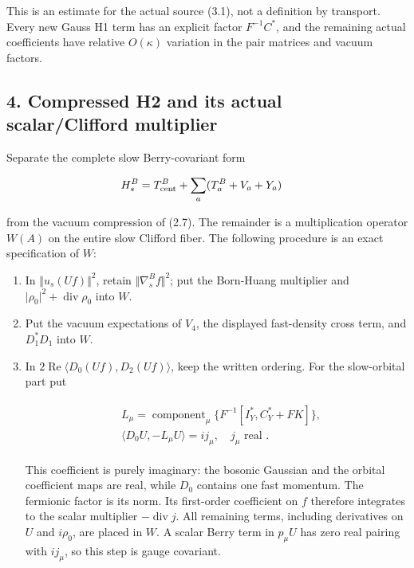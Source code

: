 This is an estimate for the actual source (3.1), not a definition by
transport. Every new Gauss H1 term has an explicit factor
\(F^{-1} C^{*}\), and the remaining actual coefficients have relative
\(O(\kappa )\) variation in the pair matrices and vacuum factors.

\subsection{4. Compressed H2 and its actual scalar/Clifford
multiplier}\label{d-compressed-h2-and-its-actual-scalarclifford-multiplier}

Separate the complete slow Berry-covariant form

\begin{gather*}
\begin{aligned}
& H_{s}^{B}=T_{\mathrm{cent}}^{B}+\sum _{a}(T_{a}^{B}+V_{a}+Y_{a})
\end{aligned}\notag
\end{gather*}

from the vacuum compression of (2.7). The remainder is a multiplication
operator \(W(A)\) on the entire slow Clifford fiber. The following
procedure is an exact specification of \(W\):

\begin{enumerate}
\def\labelenumi{\arabic{enumi}.}
\item
  In \(\Vert u_{s}(Uf)\Vert ^{2}\), retain
  \(\Vert \nabla _{s}^{B} f\Vert ^{2}\); put the Born-Huang multiplier
  and \(\vert \rho _{0}\vert ^{2}+\operatorname{div}  \rho _{0}\) into
  \(W\).
\item
  Put the vacuum expectations of \(V_{4}\), the displayed fast-density
  cross term, and \(D_{1}^{*}D_{1}\) into \(W\).
\item
  In \(2 \operatorname{Re} \langle D_{0}(Uf),D_{2}(Uf)\rangle\), keep
  the written ordering. For the slow-orbital part put

  \begin{gather*}
  \begin{aligned}
  & L_{\mu} = \operatorname{component} _{\mu}\{F^{-1}[I_{Y}^{*},C_{Y}^{*}+F K]\}, \\
  & \langle D_{0} U,-L_{\mu} U\rangle  = i j_{\mu}, \quad  j_{\mu} \text{ real }.
  \end{aligned}\tag{4.1}
  \end{gather*}

  This coefficient is purely imaginary: the bosonic Gaussian and the
  orbital coefficient maps are real, while \(D_{0}\) contains one fast
  momentum. The fermionic factor is its norm. Its first-order
  coefficient on \(f\) therefore integrates to the scalar multiplier
  \(-\operatorname{div}  j\). All remaining terms, including derivatives
  on \(U\) and \(i \rho _{0}\), are placed in \(W\). A scalar Berry term
  in \(p_{\mu} U\) has zero real pairing with \(i j_{\mu}\), so this
  step is gauge covariant.
\end{enumerate}

